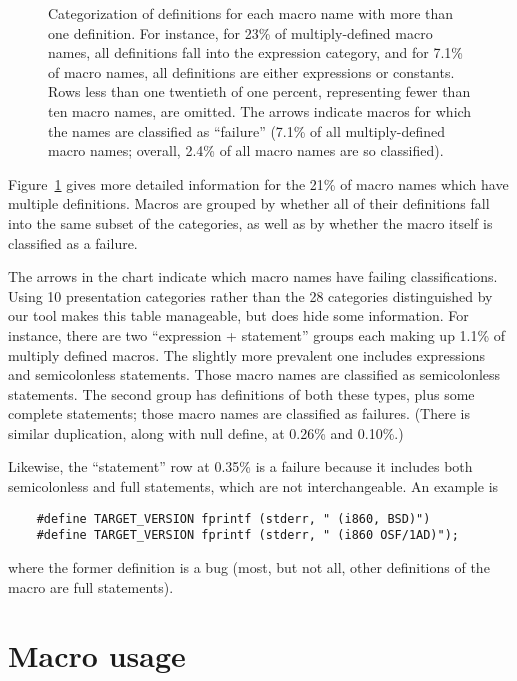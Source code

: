 \documentclass[10pt]{article}
\newcommand{\captionsmall}[1]{\caption[]{\small #1}}
\begin{document}
\begin{figure}
  {\small\centerline{}}
  
  \captionsmall{Categorization of definitions for each macro name with more
    than one definition.  For instance, for 23\% of multiply-defined macro
    names, all definitions fall into the expression category, and for 7.1\%
    of macro names, all definitions are either expressions or constants.
    Rows less than one twentieth of one percent, representing fewer than
    ten macro names, are omitted.  The arrows indicate macros for which the
    names are classified as ``failure'' (7.1\% of all multiply-defined
    macro names; overall, 2.4\% of all macro names are so classified).}

  \label{fig:subset-categories}
\end{figure}

Figure~\ref{fig:subset-categories} gives more detailed information for the
21\% of macro names which have multiple definitions.  Macros are grouped by
whether all of their definitions fall into the same subset of the
categories, as well as by whether the macro itself is classified as a
failure.

The arrows in the chart indicate which macro names have failing
classifications.  Using 10 presentation categories rather than the 28
categories distinguished by our tool makes this table manageable, but does
hide some information.  For instance, there are two ``expression +
statement'' groups each making up 1.1\% of multiply defined macros.  The
slightly more prevalent one includes expressions and semicolonless
statements.  Those macro names are classified as semicolonless statements.
The second group has definitions of both these types, plus some complete
statements; those macro names are classified as failures.  (There is
similar duplication, along with null define, at 0.26\% and 0.10\%.)

Likewise, the ``statement'' row at 0.35\% is a failure because it includes
both semicolonless and full statements, which are not interchangeable.  An
example is
\begin{verbatim}
    #define TARGET_VERSION fprintf (stderr, " (i860, BSD)")
    #define TARGET_VERSION fprintf (stderr, " (i860 OSF/1AD)");
\end{verbatim}
where the former definition is a bug (most, but not all, other definitions
of the macro are full statements).




\section{Macro usage}
\end{document}
